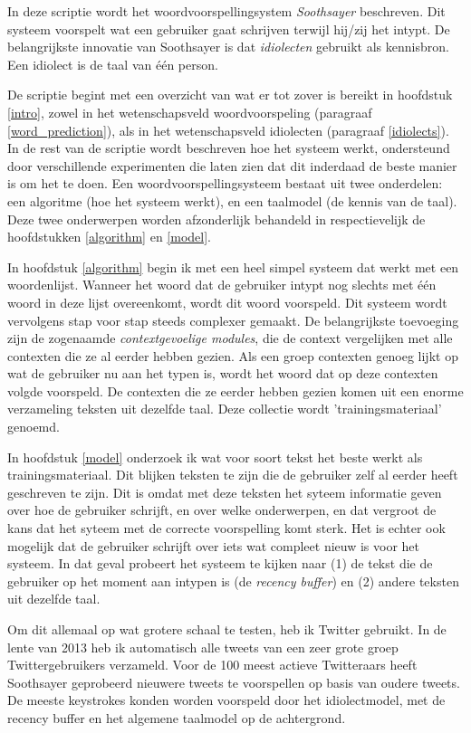 \documentclass[12pt]{article}
\begin{document}
In deze scriptie wordt het woordvoorspellingsystem \emph{Soothsayer} beschreven. Dit systeem voorspelt wat een gebruiker gaat schrijven terwijl hij/zij het intypt. De belangrijkste innovatie van Soothsayer is dat \emph{idiolecten} gebruikt als kennisbron. Een idiolect is de taal van \'e\'en person.

De scriptie begint met een overzicht van wat er tot zover is bereikt in hoofdstuk \ref{intro}, zowel in het wetenschapsveld woordvoorspeling (paragraaf \ref{word_prediction}), als in het wetenschapsveld idiolecten (paragraaf \ref{idiolects}). In de rest van de scriptie wordt beschreven hoe het systeem werkt, ondersteund door verschillende experimenten die laten zien dat dit inderdaad de beste manier is om het te doen. Een woordvoorspellingsysteem bestaat uit twee onderdelen: een algoritme (hoe het systeem werkt), en een taalmodel (de kennis van de taal). Deze twee onderwerpen worden afzonderlijk behandeld in respectievelijk de hoofdstukken \ref{algorithm} en \ref{model}.

In hoofdstuk \ref{algorithm} begin ik met een heel simpel systeem dat werkt met een woordenlijst. Wanneer het woord dat de gebruiker intypt nog slechts met \'e\'en woord in deze lijst overeenkomt, wordt dit woord voorspeld. Dit systeem wordt vervolgens stap voor stap steeds complexer gemaakt. De belangrijkste toevoeging zijn de zogenaamde \emph{contextgevoelige modules}, die de context vergelijken met alle contexten die ze al eerder hebben gezien. Als een groep contexten genoeg lijkt op wat de gebruiker nu aan het typen is, wordt het woord dat op deze contexten volgde voorspeld. De contexten die ze eerder hebben gezien komen uit een enorme verzameling teksten uit dezelfde taal. Deze collectie wordt 'trainingsmateriaal' genoemd.

In hoofdstuk \ref{model} onderzoek ik wat voor soort tekst het beste werkt als trainingsmateriaal. Dit blijken teksten te zijn die de gebruiker zelf al eerder heeft geschreven te zijn. Dit is omdat met deze teksten het syteem informatie geven over hoe de gebruiker schrijft, en over welke onderwerpen, en dat vergroot de kans dat het syteem met de correcte voorspelling komt sterk. Het is echter ook mogelijk dat de gebruiker schrijft over iets wat compleet nieuw is voor het systeem. In dat geval probeert het systeem te kijken naar (1) de tekst die de gebruiker op het moment aan intypen is (de \emph{recency buffer}) en (2) andere teksten uit dezelfde taal.

Om dit allemaal op wat grotere schaal te testen, heb ik Twitter gebruikt. In de lente van 2013 heb ik automatisch alle tweets van een zeer grote groep Twittergebruikers verzameld. Voor de 100 meest actieve Twitteraars heeft Soothsayer geprobeerd nieuwere tweets te voorspellen op basis van oudere tweets. De meeste keystrokes konden worden voorspeld door het idiolectmodel, met de recency buffer en het algemene taalmodel op de achtergrond.
\end{document}
